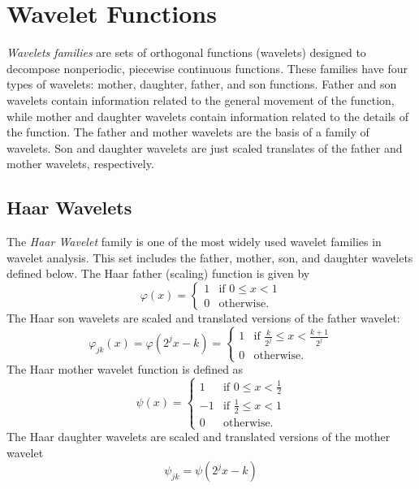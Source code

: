 
\section*{Wavelet Functions}

\emph{Wavelets families} are sets of orthogonal functions (wavelets) designed to decompose nonperiodic, piecewise continuous functions.
These families have four types of wavelets: mother, daughter, father, and son functions.
Father and son wavelets contain information related to the general movement of the function, while mother and daughter wavelets contain information related to the details of the function.
The father and mother wavelets are the basis of a family of wavelets.
Son and daughter wavelets are just scaled translates of the father and mother wavelets, respectively.

\subsection*{Haar Wavelets}

The \emph{Haar Wavelet} family is one of the most widely used wavelet families in wavelet analysis.
This set includes the father, mother, son, and daughter wavelets defined below.
The Haar father (scaling) function is given by
\[
\varphi(x) =
 \begin{cases}
 1 & \text{if } 0 \leq x < 1 \\
 0 & \text{otherwise.}
 \end{cases}
\]
The Haar son wavelets are scaled and translated versions of the father wavelet:
\[
\varphi_{jk}(x)=\varphi(2^jx-k) =
 \begin{cases}
 1 & \text{if }\frac{k}{2^j} \leq x < \frac{k+1}{2^j} \\
 0 & \text{otherwise.}
 \end{cases}
\]
The Haar mother wavelet function is defined as
\[
\psi(x) =
 \begin{cases}
  1 & \text{if } 0 \leq x < \frac{1}{2} \\
  -1 & \text{if } \frac{1}{2} \leq x < 1 \\
  0 & \text{otherwise.}
 \end{cases}
\]
The Haar daughter wavelets are scaled and translated versions of the mother wavelet
\[
\psi_{jk}=\psi(2^jx-k)
\]


